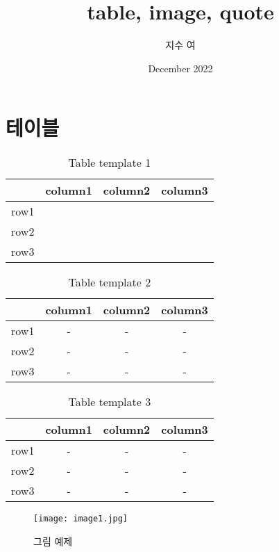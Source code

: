 \documentclass{article}
\title{table, image, quote}
\author{지수 여}
\date{December 2022}
\begin{document}
\maketitle
\section{테이블}
\begin{table}
    \centering
    \caption{Table template 1}
    \label{t1}
    \begin{tabular}{|c|c|c|c|}
        \noalign{\smallskip}\noalign{\smallskip}
        \hline %
             & column1 & column2 & column3 \\
        \hline 
        row1 &         &         &         \\
        \hline 
        row2 &         &         &         \\
        \hline 
        row3 &         &         &         \\
        \hline
    \end{tabular}
\end{table}

\begin{table}
    \centering
    \caption{Table template 2}
    \label{t2}
    \begin{tabular}{c|ccc}
        \noalign{\smallskip}\noalign{\smallskip}
        \hline\hline %
             & column1 & column2 & column3 \\
        \hline 
        row1 &    -    &    -    &    -    \\
        \hline 
        row2 &    -    &    -    &    -    \\
        \hline 
        row3 &    -    &    -    &    -    \\
        \hline\hline
    \end{tabular}
\end{table}

\begin{table}
    \centering
    \caption{Table template 3}
    \label{t3}
    \begin{tabular}{c|ccc}
        \noalign{\smallskip}\noalign{\smallskip}
        \hline\hline %
             & column1 & column2 & column3 \\
        \hline
        row1 &    -    &    -    &    -    \\
        row2 &    -    &    -    &    -    \\
        row3 &    -    &    -    &    -    \\
        \hline\hline
    \end{tabular}
\end{table}

\begin{figure}[!ht]
\centering
\texttt{[image: image1.jpg]}
\caption{그림 예제}
\label{fig:example1}
\end{figure}
\end{document}
